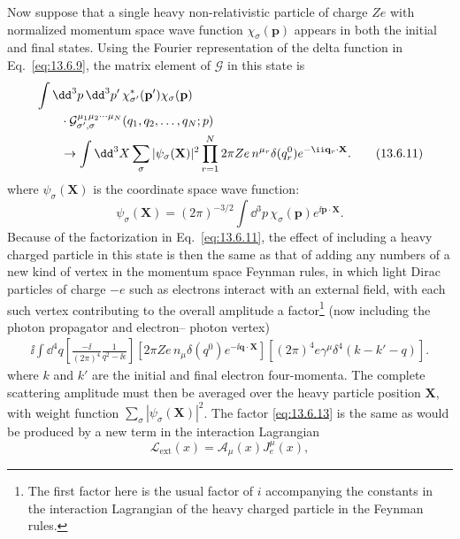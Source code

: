 Now suppose that a single heavy non-relativistic particle of charge $Ze$
with normalized momentum space wave function $\chi_\sigma(\mathbf p)$ appears in both
the initial and final states. Using the Fourier representation of the delta
function in Eq.~\eqref{eq:13.6.9}, the matrix element of $\mathcal G$ in this state is
\begin{align}
&\int \dd^3p\,\dd^3p'\,\chi^*_{\sigma'}(\mathbf p')\chi_\sigma(\mathbf p)
\notag\\
&\qquad\cdot
\mathcal G^{\mu_1\mu_2\cdots\mu_N}_{\sigma',\sigma}
(q_1,q_2,\ldots,q_N;p)
\notag\\
&\qquad\to
\int \dd^3X\sum_\sigma|\psi_\sigma(\mathbf X)|^2
\prod_{r=1}^N 2\pi Ze\,n^{\mu_r}\delta(q_r^0)e^{-\ii\mathbf q_r\cdot\mathbf X}.
\tag{13.6.11}\label{eq:13.6.11}
\end{align}
where $\psi_\sigma(\mathbf X)$ is the coordinate space wave function:
\begin{equation}
\psi_\sigma(\mathbf X)=(2\pi)^{-3/2}\int \dd^3p\,
\chi_\sigma(\mathbf p)e^{\ii\mathbf p\cdot\mathbf X}.
\tag{13.6.12}\label{eq:13.6.12}
\end{equation}
Because of the factorization in Eq.~\eqref{eq:13.6.11}, the effect of including a
heavy charged particle in this state is then the same as that of adding
any numbers of a new kind of vertex in the momentum space Feynman
rules, in which light Dirac particles of charge $-e$ such as electrons interact
with an external field, with each such vertex contributing to the overall
amplitude a factor\footnote{The first factor here is the usual factor of $i$ accompanying the constants in the interaction
Lagrangian of the heavy charged particle in the Feynman rules.} (now including the photon propagator and electron--
photon vertex)
\begin{align}
\ii\int \dd^4q\left[\frac{-\ii}{(2\pi)^4}\frac{1}{q^2-\ii\epsilon}\right]
\left[2\pi Ze\,n_\mu\delta(q^0)e^{-\ii\mathbf q\cdot\mathbf X}\right]
\left[(2\pi)^4e\gamma^\mu\delta^4(k-k'-q)\right].
\tag{13.6.13}\label{eq:13.6.13}
\end{align}
where $k$ and $k'$ are the initial and final electron four-momenta. The
complete scattering amplitude must then be averaged over the heavy
particle position $\mathbf X$, with weight function $\sum_\sigma|\psi_\sigma(\mathbf X)|^2$. The factor \eqref{eq:13.6.13}
is the same as would be produced by a new term in the interaction
Lagrangian
\begin{equation}
\mathcal L_{\mathrm{ext}}(x)=\mathcal A_\mu(x)J_e^\mu(x),
\tag{13.6.14}\label{eq:13.6.14}
\end{equation}
